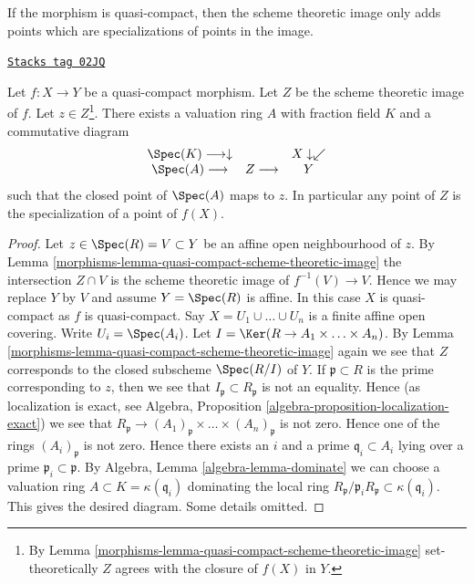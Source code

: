 If the morphism is quasi-compact, then the scheme theoretic image only
adds points which are specializations of points in the image.

\begin{lemma}
\label{morphisms-lemma-reach-points-scheme-theoretic-image}
\href{https://stacks.math.columbia.edu/tag/02JQ}{\texttt{Stacks tag 02JQ}}

Let $f : X \to Y$ be a quasi-compact morphism.
Let $Z$ be the scheme theoretic image of $f$.
Let $z \in Z$\footnote{By
Lemma \ref{morphisms-lemma-quasi-compact-scheme-theoretic-image} set-theoretically
$Z$ agrees with the closure of $f(X)$ in $Y$.}.
There exists a valuation ring $A$ with
fraction field $K$ and a commutative diagram
$$
\begin{array}{ccc}\Spec(K) \longrightarrow\downarrow &  & X \downarrow\swarrow \\ \Spec(A) \longrightarrow & Z \longrightarrow & Y\end{array}
$$
such that the closed point of $\Spec(A)$ maps to $z$. In particular
any point of $Z$ is the specialization of a point of $f(X)$.
\end{lemma}

\begin{proof}

Let $z \in \Spec(R) = V \subset Y$ be an affine open
neighbourhood of $z$. By
Lemma \ref{morphisms-lemma-quasi-compact-scheme-theoretic-image}
the intersection $Z \cap V$ is the scheme theoretic image of
$f^{-1}(V) \to V$. Hence we may replace $Y$ by $V$
and assume $Y = \Spec(R)$ is affine.
In this case $X$ is quasi-compact as $f$ is quasi-compact.
Say $X = U_1 \cup \ldots \cup U_n$
is a finite affine open covering. Write $U_i = \Spec(A_i)$.
Let $I = \Ker(R \to A_1 \times \ldots \times A_n)$.
By Lemma \ref{morphisms-lemma-quasi-compact-scheme-theoretic-image}
again we see that $Z$ corresponds to the closed subscheme
$\Spec(R/I)$ of $Y$. If $\mathfrak p \subset R$ is
the prime corresponding to $z$, then we see that
$I_{\mathfrak p} \subset R_{\mathfrak p}$ is not an
equality. Hence (as localization is exact, see
Algebra, Proposition \ref{algebra-proposition-localization-exact})
we see that
$R_{\mathfrak p} \to
(A_1)_{\mathfrak p} \times \ldots \times (A_n)_{\mathfrak p}$
is not zero. Hence one of the rings $(A_i)_{\mathfrak p}$ is not zero.
Hence there exists an $i$ and a prime $\mathfrak q_i \subset A_i$
lying over a prime $\mathfrak p_i \subset \mathfrak p$.
By Algebra, Lemma \ref{algebra-lemma-dominate} we can choose a valuation ring
$A \subset K = \kappa(\mathfrak q_i)$ dominating
the local ring
$R_{\mathfrak p}/\mathfrak p_iR_{\mathfrak p} \subset \kappa(\mathfrak q_i)$.
This gives the desired diagram. Some details omitted.
\end{proof}

